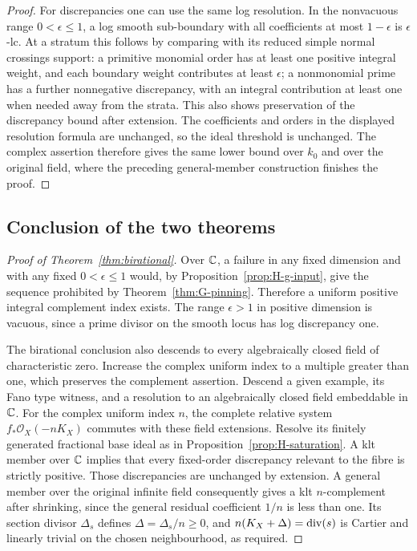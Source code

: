 \begin{proof}
For discrepancies one can use the same log resolution.  In the
nonvacuous range $0<\epsilon\le1$, a log smooth sub-boundary with all
coefficients at most $1-\epsilon$ is $\epsilon$-lc.  At a stratum this
follows by comparing with its reduced simple normal crossings support:
a primitive monomial order has at least one positive integral weight,
and each boundary weight contributes at least $\epsilon$; a
nonmonomial prime has a further nonnegative discrepancy, with an integral
contribution at least one when needed away from the strata.  This also
shows preservation of the discrepancy bound after extension.  The
coefficients and orders in the displayed resolution formula are unchanged,
so the ideal threshold is unchanged.  The complex assertion therefore
gives the same lower bound over $k_0$ and over the original field, where
the preceding general-member construction finishes the proof.
\end{proof}

\subsection{Conclusion of the two theorems}

\begin{proof}[Proof of Theorem~\ref{thm:birational}]
Over $\mathbb C$, a failure in any fixed dimension and with any fixed
$0<\epsilon\le1$ would, by Proposition~\ref{prop:H-g-input}, give the
sequence prohibited by Theorem~\ref{thm:G-pinning}.  Therefore a uniform
positive integral complement index exists.  The range $\epsilon>1$
in positive dimension is vacuous, since a prime divisor on the smooth
locus has log discrepancy one.

The birational conclusion also descends to every algebraically closed
field of characteristic zero.  Increase the complex uniform index to a
multiple greater than one, which preserves the complement assertion.
Descend a given example, its Fano type
witness, and a resolution to an algebraically closed field embeddable
in $\mathbb C$.  For the complex uniform index $n$, the complete relative
system $f_*\mathcal O_X(-nK_X)$ commutes with these field extensions.
Resolve its finitely generated fractional base ideal as in
Proposition~\ref{prop:H-saturation}.  A klt member over $\mathbb C$ implies
that every fixed-order discrepancy relevant to the fibre is strictly
positive.  Those discrepancies are unchanged by extension.  A general
member over the original infinite field consequently gives a klt
$n$-complement after shrinking, since the general residual coefficient
$1/n$ is less than one.  Its
section divisor $\Delta_s$ defines
$\Delta=\Delta_s/n\ge0$, and
$n(K_X+\Delta)=\operatorname{div}(s)$ is Cartier and linearly trivial on the
chosen neighbourhood, as required.
\end{proof}

